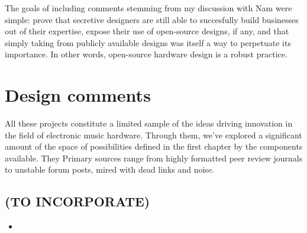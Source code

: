 The goals of including comments stemming from my discussion with Nam were simple: prove that secretive designers are still able to succesfully build businesses out of their expertise, expose their use of open-source designs, if any, and that simply taking from publicly available designs was itself a way to perpetuate its importance. In other words, open-source hardware design is a robust practice. 

\section{Design comments}

All these projects constitute a limited sample of the ideas driving innovation in the field of electronic music hardware. Through them, we've explored a significant amount of the space of possibilities defined in the first chapter by the components available. They  Primary sources range from highly formatted peer review journals to unstable forum posts, mired with dead links and noise.  



\begin{unsortedStuff}	
\section*{(TO INCORPORATE)}
	\begin{itemize}
		\item 
	\end{itemize}
\end{unsortedStuff}
		
\begin{optBlankSpace}
	\newpage
	\mbox{}
\end{optBlankSpace}

